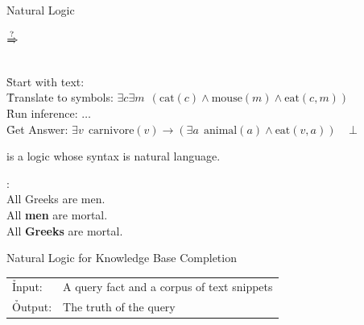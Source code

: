 \documentclass[hyperref]{beamer}
\begin{document}
\begin{frame}{Natural Logic}
\begin{center}
 $\xRightarrow{?}$ 
\end{center}

 \\
\hspace{0.5cm} \h{Start with text:}  \\
\pause
\hspace{0.5cm} \h{Translate to symbols:} $\exists c \exists m ~~\left( \textrm{cat}(c) \land \textrm{mouse}(m) \land \textrm{eat}(c,m) \right)$ \\
\pause
\hspace{0.5cm} \h{Run inference:} $\dots$ \\
\pause
\hspace{0.5cm} \h{Get Answer:} $\exists v ~~ \textrm{carnivore}(v) \rightarrow \left( \exists a ~~ \textrm{animal}(a) \land \textrm{eat}(v, a) \right) ~~~~~ \bot$
\vspace{0.5cm}
\pause

 is a logic whose syntax is natural language. \\
\vspace{0.5cm}
\pause

:\\
\hspace{0.5cm} \textcolor<7->[rgb]{0,0.5,0}{All Greeks are men.} \\
\hspace{0.5cm} All \textbf<8->{men} are mortal. \\
\hspace{0.5cm} All \textbf<8->{Greeks} are mortal. \\
\end{frame}

\begin{frame}{Natural Logic for Knowledge Base Completion}
\begin{tabular}{ll}
  \h{Input:} & A query fact and a corpus of text snippets \\
  \h{Output:} & The truth of the query
\end{tabular}
\vspace{0.25cm}
\pause

\begin{center}
  \resizebox{8cm}{!}{\teaserSearch}
\end{center}
\end{frame}
\end{document}
